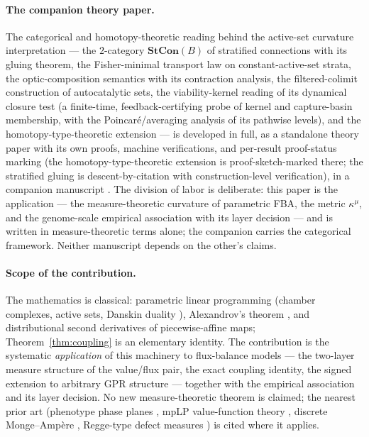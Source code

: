 \documentclass[11pt,a4paper]{article}
\theoremstyle{plain}
\theoremstyle{definition}
\theoremstyle{remark}
\newcommand{\kmu}{\kappa^{\mu}}
\begin{document}
\paragraph{The companion theory paper.}
The categorical and homotopy-theoretic reading behind the
active-set curvature interpretation --- the $2$-category
$\mathbf{StCon}(B)$ of stratified connections with its gluing
theorem, the Fisher-minimal transport law on constant-active-set
strata, the optic-composition semantics with its contraction
analysis, the filtered-colimit construction of autocatalytic sets,
the viability-kernel reading of its dynamical closure test (a
finite-time, feedback-certifying probe of kernel and capture-basin
membership, with the Poincar\'e/averaging analysis of its pathwise
levels), and the homotopy-type-theoretic extension --- is developed
in full,
as a standalone theory paper with its own proofs, machine
verifications, and per-result proof-status marking (the
homotopy-type-theoretic extension is proof-sketch-marked there; the
stratified gluing is descent-by-citation with construction-level
verification), in a companion manuscript \citep{zai2026categorical}.
The division of labor is deliberate: this paper is the application --- the
measure-theoretic curvature of parametric FBA, the metric $\kmu$,
and the genome-scale empirical association with its layer decision
--- and is written in measure-theoretic terms alone; the companion
carries the categorical framework. Neither manuscript depends on the other's claims.

\paragraph{Scope of the contribution.}
The mathematics is classical: parametric linear programming (chamber
complexes, active sets, Danskin duality \citep{danskin1967}), Alexandrov's theorem \citep{alexandrov1939}, and
distributional second derivatives of piecewise-affine maps;
Theorem~\ref{thm:coupling} is an elementary identity. The contribution
is the systematic \emph{application} of this machinery to flux-balance
models \citep{varma1994, orth2010, lewis2010} --- the two-layer measure structure of the value/flux pair,
the exact coupling identity, the signed extension to arbitrary GPR
structure --- together with the empirical association and its layer
decision. No new measure-theoretic theorem is claimed; the nearest
prior art (phenotype phase planes \citep{edwards2001, ibarra2002}, mpLP
value-function theory \citep{borrelli2003},
discrete Monge--Amp\`ere \citep{gutierrez2001}, Regge-type defect measures \citep{regge1961, cheeger1984}) is cited where
it applies.
\end{document}
